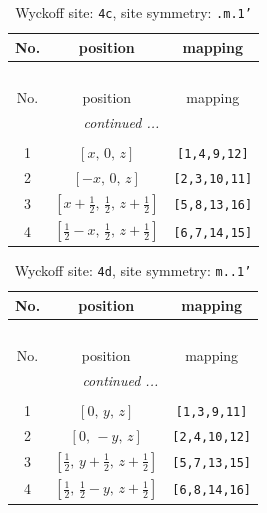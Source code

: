 \documentclass[fleqn,8pt]{jsarticle}
\begin{document}
\renewcommand{\arraystretch}{1.2}
\begin{longtable}{ccc}
\caption{Wyckoff site: {\tt 4c}, site symmetry: {\tt .m.1'}}
 \\
 \hline \hline
No. & position & mapping \\ \hline \endfirsthead

\multicolumn{2}{l}{\tablename\ \thetable{}} \\
 \hline \hline
No. & position & mapping \\ \hline \endhead

 \hline \hline
\multicolumn{2}{r}{\footnotesize\it continued ...} \\ \endfoot

 \hline \hline
\multicolumn{2}{r}{} \\ \endlastfoot

1 & $\left[ x,\, 0,\, z \right]$ & {\tt [1,4,9,12]} \\ \hline
2 & $\left[ - x,\, 0,\, z \right]$ & {\tt [2,3,10,11]} \\ \hline
3 & $\left[ x + \frac{1}{2},\, \frac{1}{2},\, z + \frac{1}{2} \right]$ & {\tt [5,8,13,16]} \\ \hline
4 & $\left[ \frac{1}{2} - x,\, \frac{1}{2},\, z + \frac{1}{2} \right]$ & {\tt [6,7,14,15]} \\
\end{longtable}
\renewcommand{\arraystretch}{1.2}
\begin{longtable}{ccc}
\caption{Wyckoff site: {\tt 4d}, site symmetry: {\tt m..1'}}
 \\
 \hline \hline
No. & position & mapping \\ \hline \endfirsthead

\multicolumn{2}{l}{\tablename\ \thetable{}} \\
 \hline \hline
No. & position & mapping \\ \hline \endhead

 \hline \hline
\multicolumn{2}{r}{\footnotesize\it continued ...} \\ \endfoot

 \hline \hline
\multicolumn{2}{r}{} \\ \endlastfoot

1 & $\left[ 0,\, y,\, z \right]$ & {\tt [1,3,9,11]} \\ \hline
2 & $\left[ 0,\, - y,\, z \right]$ & {\tt [2,4,10,12]} \\ \hline
3 & $\left[ \frac{1}{2},\, y + \frac{1}{2},\, z + \frac{1}{2} \right]$ & {\tt [5,7,13,15]} \\ \hline
4 & $\left[ \frac{1}{2},\, \frac{1}{2} - y,\, z + \frac{1}{2} \right]$ & {\tt [6,8,14,16]} \\
\end{longtable}
\end{document}
